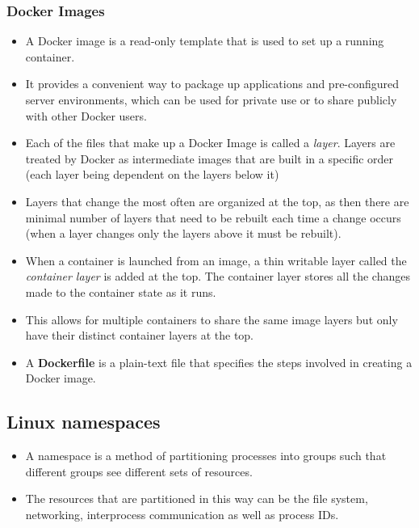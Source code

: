 \documentclass{article}
\begin{document}
\subsubsection{Docker Images}
\begin{itemize}
    \item A Docker image is a read-only template that is used to set up a running container. 
    
    \item It provides a convenient way to package up applications and pre-configured server environments, which can be used for private use or to share publicly with other Docker users.
    
    \item Each of the files that make up a Docker Image is called a \textit{layer}. Layers are treated by Docker as intermediate images that are built in a specific order (each layer being dependent on the layers below it)
    
    \item Layers that change the most often are organized at the top, as then there are minimal number of layers that need to be rebuilt each time a change occurs (when a layer changes only the layers above it must be rebuilt). 
    
    \item When a container is launched from an image, a thin writable layer called the \textit{container layer} is added at the top. The container layer stores all the changes made to the container state as it runs. 
    
    \item This allows for multiple containers to share the same image layers but only have their distinct container layers at the top. 

    \item A \textbf{Dockerfile} is a plain-text file that specifies the steps involved in creating a Docker image. 
\end{itemize}

\subsection{Linux namespaces }
\begin{itemize}
    \item A namespace is a method of partitioning processes into groups such that different groups see different sets of resources.
    
    \item The resources that are partitioned in this way can be the file system, networking, interprocess communication as well as process IDs.
\end{itemize}
\end{document}
